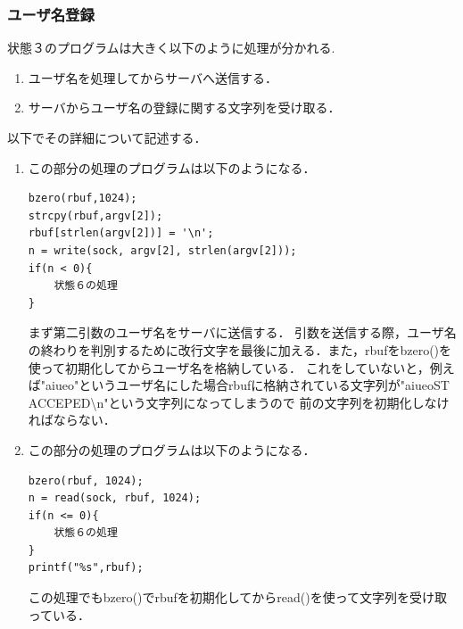 \documentclass[dvipdfmx]{jarticle}
\begin{document}
\subsubsection{ユーザ名登録}
状態３のプログラムは大きく以下のように処理が分かれる.
\begin{enumerate}
    \item ユーザ名を処理してからサーバへ送信する．
    \item サーバからユーザ名の登録に関する文字列を受け取る．
\end{enumerate}
以下でその詳細について記述する．
\begin{enumerate}
    \item この部分の処理のプログラムは以下のようになる．
    \begin{lstlisting}
bzero(rbuf,1024);
strcpy(rbuf,argv[2]);
rbuf[strlen(argv[2])] = '\n';
n = write(sock, argv[2], strlen(argv[2]));
if(n < 0){
    状態６の処理
}
    \end{lstlisting}
    まず第二引数のユーザ名をサーバに送信する．
    引数を送信する際，ユーザ名の終わりを判別するために改行文字を最後に加える．また，rbufをbzero()を使って初期化してからユーザ名を格納している．
    これをしていないと，例えば"aiueo"というユーザ名にした場合rbufに格納されている文字列が"aiueoST ACCEPED\textbackslash n"という文字列になってしまうので
    前の文字列を初期化しなければならない．
    \item この部分の処理のプログラムは以下のようになる．
    \begin{lstlisting}
bzero(rbuf, 1024);
n = read(sock, rbuf, 1024);
if(n <= 0){
    状態６の処理
}
printf("%s",rbuf);  
    \end{lstlisting}
    この処理でもbzero()でrbufを初期化してからread()を使って文字列を受け取っている．
\end{enumerate}
\end{document}
